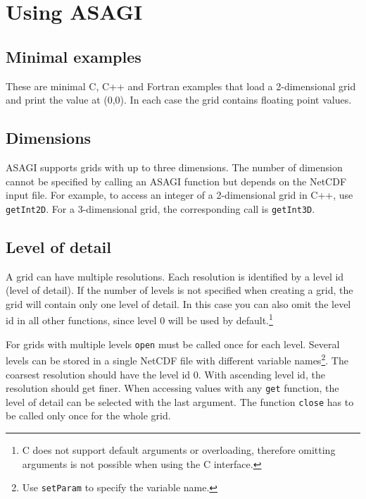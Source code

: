 \section{Using ASAGI}

\subsection{Minimal examples}

These are minimal C, C++ and Fortran examples that load a 2-dimensional grid and print the value at (0,0). In each case the grid contains floating point values.







\subsection{Dimensions}

ASAGI supports grids with up to three dimensions. The number of dimension cannot be specified by calling an ASAGI function but depends on the NetCDF input file. For example, to access an integer of a 2-dimensional grid in C++, use \texttt{getInt2D}. For a 3-dimensional grid, the corresponding call is \texttt{getInt3D}.

\subsection{Level of detail}

A grid can have multiple resolutions. Each resolution is identified by a level id (level of detail). If the number of levels is not specified when creating a grid, the grid will contain only one level of detail. In this case you can also omit the level id in all other functions, since level 0 will be used by default.\footnote{C does not support default arguments or overloading, therefore omitting arguments is not possible when using the C interface.}

For grids with multiple levels \texttt{open} must be called once for each level. Several levels can be stored in a single NetCDF file with different variable names\footnote{Use \texttt{setParam} to specify the variable name.}. The coarsest resolution should have the level id 0. With ascending level id, the resolution should get finer. When accessing values with any \texttt{get} function, the level of detail can be selected with the last argument. The function \texttt{close} has to be called only once for the whole grid.

